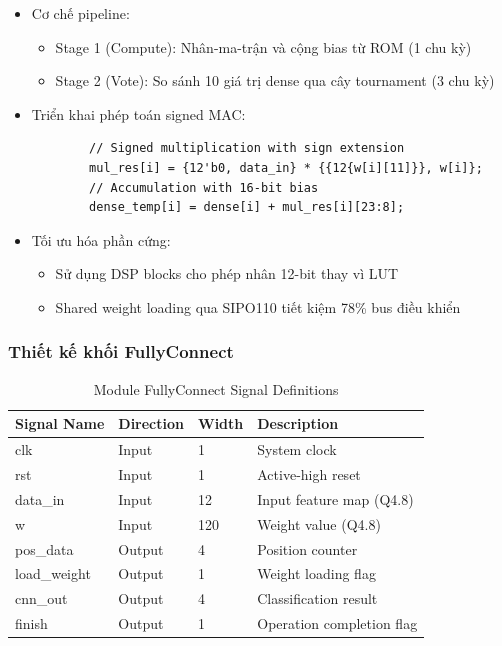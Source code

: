 \begin{itemize}
    \item Cơ chế pipeline:
    \begin{itemize}
        \item Stage 1 (Compute): Nhân-ma-trận và cộng bias từ ROM (1 chu kỳ)
        \item Stage 2 (Vote): So sánh 10 giá trị dense qua cây tournament (3 chu kỳ)
    \end{itemize}

    \item Triển khai phép toán signed MAC:
    \begin{verbatim}
        // Signed multiplication with sign extension
        mul_res[i] = {12'b0, data_in} * {{12{w[i][11]}}, w[i]}; 
        // Accumulation with 16-bit bias
        dense_temp[i] = dense[i] + mul_res[i][23:8];
    \end{verbatim}

    \item Tối ưu hóa phần cứng:
    \begin{itemize}
        \item Sử dụng DSP blocks cho phép nhân 12-bit thay vì LUT
        \item Shared weight loading qua SIPO110 tiết kiệm 78\% bus điều khiển
    \end{itemize}
\end{itemize}

\subsubsection{Thiết kế khối FullyConnect}
\begin{table}[H]
\centering
\caption{Module FullyConnect Signal Definitions}
\label{tab:fc_signals}
\begin{tabular}{llll}
\toprule
\textbf{Signal Name} & \textbf{Direction} & \textbf{Width} & \textbf{Description} \\
\midrule
clk & Input & 1 & System clock \\
rst & Input & 1 & Active-high reset \\
data\_in & Input & 12 & Input feature map (Q4.8) \\
w & Input & 120 & Weight value (Q4.8) \\
pos\_data & Output & 4 & Position counter \\
load\_weight & Output & 1 & Weight loading flag \\
cnn\_out & Output & 4 & Classification result \\
finish & Output & 1 & Operation completion flag \\
\bottomrule
\end{tabular}
\end{table}

